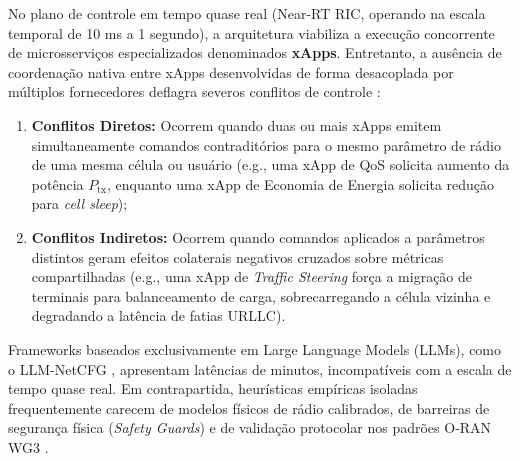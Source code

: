 \documentclass[12pt]{article}
\begin{document}
No plano de controle em tempo quase real (Near-RT RIC, operando na escala temporal de 10 ms a 1 segundo), a arquitetura viabiliza a execução concorrente de microsserviços especializados denominados \textbf{xApps}. Entretanto, a ausência de coordenação nativa entre xApps desenvolvidas de forma desacoplada por múltiplos fornecedores deflagra severos conflitos de controle \cite{elyasi2025oran}:
\begin{enumerate}
    \item \textbf{Conflitos Diretos:} Ocorrem quando duas ou mais xApps emitem simultaneamente comandos contraditórios para o mesmo parâmetro de rádio de uma mesma célula ou usuário (e.g., uma xApp de QoS solicita aumento da potência $P_{\text{tx}}$, enquanto uma xApp de Economia de Energia solicita redução para \textit{cell sleep});
    \item \textbf{Conflitos Indiretos:} Ocorrem quando comandos aplicados a parâmetros distintos geram efeitos colaterais negativos cruzados sobre métricas compartilhadas (e.g., uma xApp de \textit{Traffic Steering} força a migração de terminais para balanceamento de carga, sobrecarregando a célula vizinha e degradando a latência de fatias URLLC).
\end{enumerate}

Frameworks baseados exclusivamente em Large Language Models (LLMs), como o LLM-NetCFG \cite{lira2024llm}, apresentam latências de minutos, incompatíveis com a escala de tempo quase real. Em contrapartida, heurísticas empíricas isoladas frequentemente carecem de modelos físicos de rádio calibrados, de barreiras de segurança física (\textit{Safety Guards}) e de validação protocolar nos padrões O-RAN WG3 \cite{barbosa2026symbiotic, barbosa2026marl}.
\end{document}
